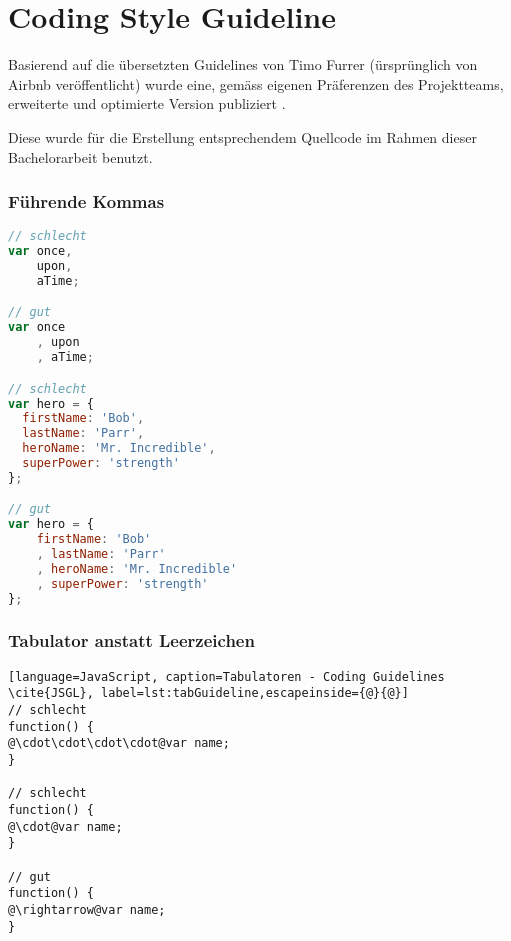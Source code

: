 \chapter{Coding Style Guideline}
\label{sec:coding-guidelines}
Basierend auf die übersetzten Guidelines von Timo Furrer \cite{JSGLDe} (ürsprünglich von Airbnb \cite{JSGLOrigin} veröffentlicht) wurde eine, gemäss eigenen Präferenzen des Projektteams, erweiterte und optimierte Version publiziert \cite{JSGL}.

Diese wurde für die Erstellung entsprechendem Quellcode im Rahmen dieser Bachelorarbeit benutzt.

\subsection*{Führende Kommas}
\begin{lstlisting}[language=JavaScript, caption=Führende Kommas - Coding Guidelines \cite{JSGL}, label=lst:leadingCommas]
// schlecht
var once,
    upon,
    aTime;

// gut
var once
    , upon
    , aTime;

// schlecht
var hero = {
  firstName: 'Bob',
  lastName: 'Parr',
  heroName: 'Mr. Incredible',
  superPower: 'strength'
};

// gut
var hero = {
    firstName: 'Bob'
    , lastName: 'Parr'
    , heroName: 'Mr. Incredible'
    , superPower: 'strength'
};
\end{lstlisting}

\subsection*{Tabulator anstatt Leerzeichen}
\begin{lstlisting}[language=JavaScript, caption=Tabulatoren - Coding Guidelines \cite{JSGL}, label=lst:tabGuideline,escapeinside={@}{@}]
// schlecht
function() {
@\cdot\cdot\cdot\cdot@var name;
}

// schlecht
function() {
@\cdot@var name;
}

// gut
function() {
@\rightarrow@var name;
}
\end{lstlisting}
